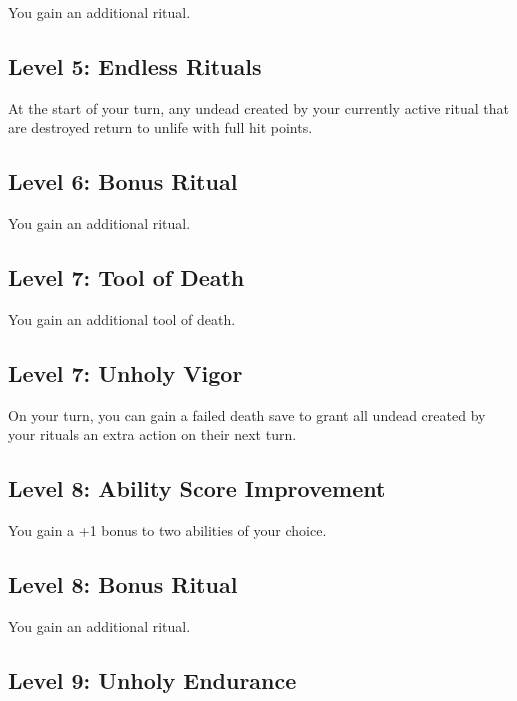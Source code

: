 \documentclass[12pt,letterpaper,twocolumn,openany,nodeprecatedcode,bg=none]{dndbook}
\begin{document}
You gain an additional ritual.

\subsection{Level 5: Endless Rituals}\label{level-5-endless-rituals}

At the start of your turn, any undead created by your currently active
ritual that are destroyed return to unlife with full hit points.

\subsection{Level 6: Bonus Ritual}\label{level-6-bonus-ritual}

You gain an additional ritual.

\subsection{Level 7: Tool of Death}\label{level-7-tool-of-death}

You gain an additional tool of death.

\subsection{Level 7: Unholy Vigor}\label{level-7-unholy-vigor}

On your turn, you can gain a failed death save to grant all undead
created by your rituals an extra action on their next turn.

\subsection{Level 8: Ability Score
Improvement}\label{level-8-ability-score-improvement}

You gain a +1 bonus to two abilities of your choice.

\subsection{Level 8: Bonus Ritual}\label{level-8-bonus-ritual}

You gain an additional ritual.

\subsection{Level 9: Unholy Endurance}\label{level-9-unholy-endurance}
\end{document}
